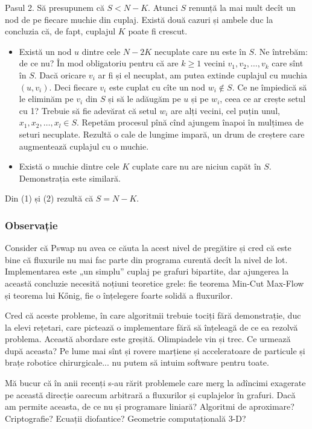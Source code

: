 \documentclass[../main.tex]{subfiles}
\begin{document}
Pasul 2. Să presupunem că $S < N - K$. Atunci $S$ renunță la mai mult decît un nod de pe fiecare muchie din cuplaj. Există două cazuri și ambele duc la concluzia că, de fapt, cuplajul $K$ poate fi crescut.

\begin{itemize}
  \item Există un nod $u$ dintre cele $N - 2K$ necuplate care nu este în $S$. Ne întrebăm: de ce nu? În mod obligatoriu pentru că are $k \geq 1$ vecini $v_1, v_2, \dots, v_k$ care sînt în $S$. Dacă oricare $v_i$ ar fi și el necuplat, am putea extinde cuplajul cu muchia $(u, v_i)$. Deci fiecare $v_i$ este cuplat cu cîte un nod $w_i \not\in S$. Ce ne împiedică să le eliminăm pe $v_i$ din $S$ și să le adăugăm pe $u$ și pe $w_i$, ceea ce ar crește setul cu 1? Trebuie să fie adevărat că setul $w_i$ are alți vecini, cel puțin unul, $x_1, x_2, \dots, x_l \in S$. Repetăm procesul pînă cînd ajungem înapoi în mulțimea de seturi necuplate. Rezultă o cale de lungime impară, un drum de creștere care augmentează cuplajul cu o muchie.

  \item Există o muchie dintre cele $K$ cuplate care nu are niciun capăt în $S$. Demonstrația este similară.
\end{itemize}

Din (1) și (2) rezultă că $S = N - K$.

\subsubsection*{Observație}

Consider că Pswap nu avea ce căuta la acest nivel de pregătire și cred că este bine că fluxurile nu mai fac parte din programa curentă decît la nivel de lot. Implementarea este „un simplu” cuplaj pe grafuri bipartite, dar ajungerea la această concluzie necesită noțiuni teoretice grele: fie teorema Min-Cut Max-Flow și teorema lui Kőnig, fie o înțelegere foarte solidă a fluxurilor.

Cred că aceste probleme, în care algoritmii trebuie tociți fără demonstrație, duc la elevi rețetari, care pictează o implementare fără să înțeleagă de ce ea rezolvă problema. Această abordare este greșită. Olimpiadele vin și trec. Ce urmează după aceasta? Pe lume mai sînt și rovere marțiene și acceleratoare de particule și brațe robotice chirurgicale... nu putem să intuim software pentru toate.

Mă bucur că în anii recenți s-au rărit problemele care merg la adîncimi exagerate pe această direcție oarecum arbitrară a fluxurilor și cuplajelor în grafuri. Dacă am permite aceasta, de ce nu și programare liniară? Algoritmi de aproximare? Criptografie? Ecuații diofantice? Geometrie computațională 3-D?
\end{document}
